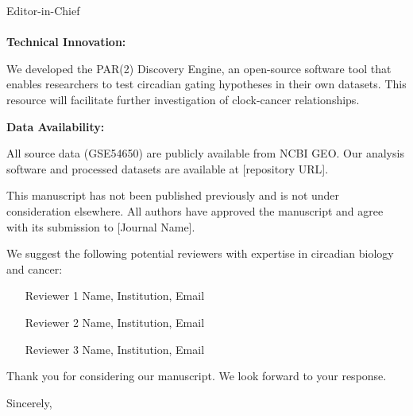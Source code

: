 \documentclass[11pt]{letter}
\begin{document}
\begin{letter}{Editor-in-Chief \\ [Journal Name] \\ [Journal Address]}
\textbf{Technical Innovation:}

We developed the PAR(2) Discovery Engine, an open-source software tool that enables researchers to test circadian gating hypotheses in their own datasets. This resource will facilitate further investigation of clock-cancer relationships.

\textbf{Data Availability:}

All source data (GSE54650) are publicly available from NCBI GEO. Our analysis software and processed datasets are available at [repository URL].

This manuscript has not been published previously and is not under consideration elsewhere. All authors have approved the manuscript and agree with its submission to [Journal Name].

We suggest the following potential reviewers with expertise in circadian biology and cancer:
\begin{itemize}
    \item [Reviewer 1 Name, Institution, Email]
    \item [Reviewer 2 Name, Institution, Email]
    \item [Reviewer 3 Name, Institution, Email]
\end{itemize}

Thank you for considering our manuscript. We look forward to your response.

\closing{Sincerely,}

\end{letter}
\end{document}
